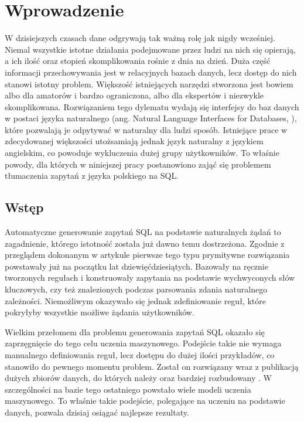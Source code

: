 \chapter{Wprowadzenie}
W dzisiejszych czasach dane odgrywają tak ważną rolę jak nigdy wcześniej.  Niemal wszystkie istotne działania podejmowane przez ludzi na nich się opierają, a ich ilość oraz stopień skomplikowania rośnie z dnia na dzień. Duża część informacji przechowywania jest w relacyjnych bazach danych, lecz dostęp do nich stanowi istotny problem. Większość istniejących narzędzi stworzona jest bowiem albo dla amatorów i bardzo ograniczona, albo dla ekspertów i niezwykle skomplikowana. Rozwiązaniem tego dylematu wydają się interfejsy do baz danych w postaci języka naturalnego (ang. Natural Language Interfaces for Databases, ), które pozwalają je odpytywać w naturalny dla ludzi sposób. Istniejące prace w zdecydowanej większości utożsamiają jednak język naturalny z językiem angielskim, co powoduje wykluczenia dużej grupy użytkowników. To właśnie powody, dla których w niniejszej pracy postanowiono zająć się problemem tłumaczenia zapytań z języka polskiego na SQL. 

\section{Wstęp}
Automatyczne generowanie zapytań SQL na podstawie naturalnych żądań to zagadnienie, którego istotność została już dawno temu dostrzeżona. Zgodnie z przeglądem dokonanym w artykule   pierwsze tego typu prymitywne rozwiązania powstawały już na początku lat dziewięćdziesiątych. Bazowały na ręcznie tworzonych regułach i konstruowały zapytania na podstawie wychwyconych słów kluczowych, czy też znalezionych podczas parsowania zdania naturalnego zależności. Niemożliwym okazywało się jednak zdefiniowanie reguł, które pokryłyby wszystkie możliwe żądania użytkowników.

Wielkim przełomem dla problemu generowania zapytań SQL okazało się zaprzęgnięcie do tego celu uczenia maszynowego. Podejście takie nie wymaga manualnego definiowania reguł, lecz dostępu do dużej ilości przykładów, co stanowiło do pewnego momentu problem. Został on rozwiązany wraz z publikacją dużych zbiorów danych, do których należy   oraz bardziej rozbudowany  . W szczególności na bazie tego ostatniego powstało wiele modeli uczenia maszynowego. To właśnie takie podejście, polegające na uczeniu na podstawie danych, pozwala dzisiaj osiągać najlepsze rezultaty.

